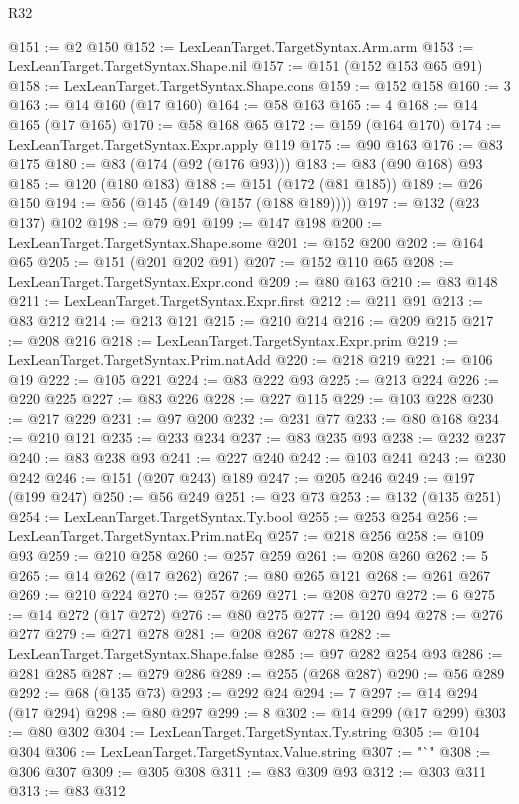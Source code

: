 \begin{lexlean}{R32}
\begin{coremodule}
@151 := @2 @150
@152 := LexLeanTarget.TargetSyntax.Arm.arm
@153 := LexLeanTarget.TargetSyntax.Shape.nil
@157 := @151 (@152 @153 @65 @91)
@158 := LexLeanTarget.TargetSyntax.Shape.cons
@159 := @152 @158
@160 := 3
@163 := @14 @160 (@17 @160)
@164 := @58 @163
@165 := 4
@168 := @14 @165 (@17 @165)
@170 := @58 @168 @65
@172 := @159 (@164 @170)
@174 := LexLeanTarget.TargetSyntax.Expr.apply @119
@175 := @90 @163
@176 := @83 @175
@180 := @83 (@174 (@92 (@176 @93)))
@183 := @83 (@90 @168) @93
@185 := @120 (@180 @183)
@188 := @151 (@172 (@81 @185))
@189 := @26 @150
@194 := @56 (@145 (@149 (@157 (@188 @189))))
@197 := @132 (@23 @137) @102
@198 := @79 @91
@199 := @147 @198
@200 := LexLeanTarget.TargetSyntax.Shape.some
@201 := @152 @200
@202 := @164 @65
@205 := @151 (@201 @202 @91)
@207 := @152 @110 @65
@208 := LexLeanTarget.TargetSyntax.Expr.cond
@209 := @80 @163
@210 := @83 @148
@211 := LexLeanTarget.TargetSyntax.Expr.first
@212 := @211 @91
@213 := @83 @212
@214 := @213 @121
@215 := @210 @214
@216 := @209 @215
@217 := @208 @216
@218 := LexLeanTarget.TargetSyntax.Expr.prim
@219 := LexLeanTarget.TargetSyntax.Prim.natAdd
@220 := @218 @219
@221 := @106 @19
@222 := @105 @221
@224 := @83 @222 @93
@225 := @213 @224
@226 := @220 @225
@227 := @83 @226
@228 := @227 @115
@229 := @103 @228
@230 := @217 @229
@231 := @97 @200
@232 := @231 @77
@233 := @80 @168
@234 := @210 @121
@235 := @233 @234
@237 := @83 @235 @93
@238 := @232 @237
@240 := @83 @238 @93
@241 := @227 @240
@242 := @103 @241
@243 := @230 @242
@246 := @151 (@207 @243) @189
@247 := @205 @246
@249 := @197 (@199 @247)
@250 := @56 @249
@251 := @23 @73
@253 := @132 (@135 @251)
@254 := LexLeanTarget.TargetSyntax.Ty.bool
@255 := @253 @254
@256 := LexLeanTarget.TargetSyntax.Prim.natEq
@257 := @218 @256
@258 := @109 @93
@259 := @210 @258
@260 := @257 @259
@261 := @208 @260
@262 := 5
@265 := @14 @262 (@17 @262)
@267 := @80 @265 @121
@268 := @261 @267
@269 := @210 @224
@270 := @257 @269
@271 := @208 @270
@272 := 6
@275 := @14 @272 (@17 @272)
@276 := @80 @275
@277 := @120 @94
@278 := @276 @277
@279 := @271 @278
@281 := @208 @267 @278
@282 := LexLeanTarget.TargetSyntax.Shape.false
@285 := @97 @282 @254 @93
@286 := @281 @285
@287 := @279 @286
@289 := @255 (@268 @287)
@290 := @56 @289
@292 := @68 (@135 @73)
@293 := @292 @24
@294 := 7
@297 := @14 @294 (@17 @294)
@298 := @80 @297
@299 := 8
@302 := @14 @299 (@17 @299)
@303 := @80 @302
@304 := LexLeanTarget.TargetSyntax.Ty.string
@305 := @104 @304
@306 := LexLeanTarget.TargetSyntax.Value.string
@307 := "`"
@308 := @306 @307
@309 := @305 @308
@311 := @83 @309 @93
@312 := @303 @311
@313 := @83 @312

\end{coremodule}
\end{lexlean}

